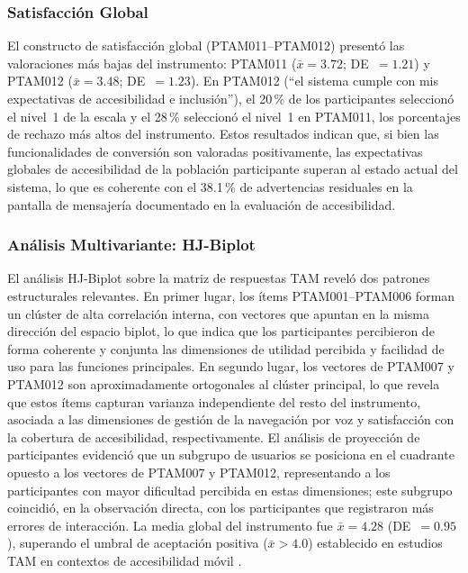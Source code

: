\documentclass[journal]{IEEEtran}
\begin{document}
			\subsubsection{Satisfacci\'on Global}
				El constructo de satisfacci\'on global (PTAM011--PTAM012) present\'o las valoraciones m\'as bajas del instrumento: PTAM011 ($\bar{x}=3.72$; DE~$=1.21$) y PTAM012 ($\bar{x}=3.48$; DE~$=1.23$). En PTAM012 (``el sistema cumple con mis expectativas de accesibilidad e inclusi\'on''), el 20\,\% de los participantes seleccion\'o el nivel~1 de la escala y el 28\,\% seleccion\'o el nivel~1 en PTAM011, los porcentajes de rechazo m\'as altos del instrumento. Estos resultados indican que, si bien las funcionalidades de conversi\'on son valoradas positivamente, las expectativas globales de accesibilidad de la poblaci\'on participante superan al estado actual del sistema, lo que es coherente con el 38.1\,\% de advertencias residuales en la pantalla de mensajer\'ia documentado en la evaluaci\'on de accesibilidad.
				
			\subsubsection{An\'alisis Multivariante: HJ-Biplot}
				El an\'alisis HJ-Biplot sobre la matriz de respuestas TAM revel\'o dos patrones estructurales relevantes. En primer lugar, los \'items PTAM001--PTAM006 forman un cl\'uster de alta correlaci\'on interna, con vectores que apuntan en la misma direcci\'on del espacio biplot, lo que indica que los participantes percibieron de forma coherente y conjunta las dimensiones de utilidad percibida y facilidad de uso para las funciones principales. En segundo lugar, los vectores de PTAM007 y PTAM012 son aproximadamente ortogonales al cl\'uster principal, lo que revela que estos \'items capturan varianza independiente del resto del instrumento, asociada a las dimensiones de gesti\'on de la navegaci\'on por voz y satisfacci\'on con la cobertura de accesibilidad, respectivamente. El an\'alisis de proyecci\'on de participantes evidenci\'o que un subgrupo de usuarios se posiciona en el cuadrante opuesto a los vectores de PTAM007 y PTAM012, representando a los participantes con mayor dificultad percibida en estas dimensiones; este subgrupo coincidi\'o, en la observaci\'on directa, con los participantes que registraron m\'as errores de interacci\'on. La media global del instrumento fue $\bar{x}=4.28$ (DE~$=0.95$), superando el umbral de aceptaci\'on positiva ($\bar{x} > 4.0$) establecido en estudios TAM en contextos de accesibilidad m\'ovil \cite{julianto2023}.
				
\end{document}
